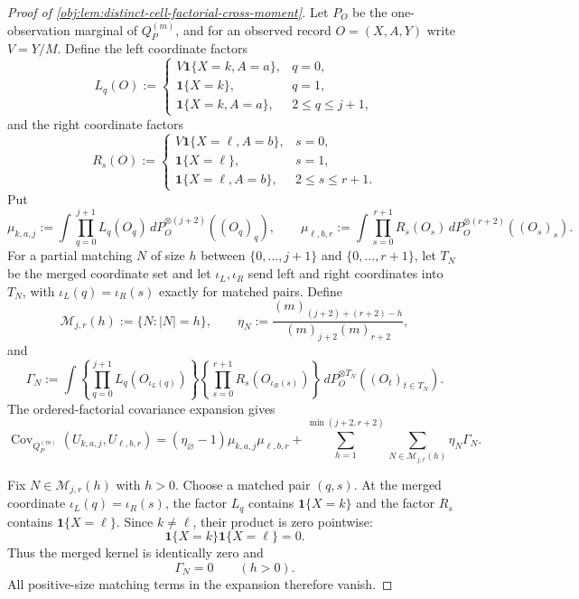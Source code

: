 \begin{proof}[Proof of \cref{obj:lem:distinct-cell-factorial-cross-moment}]
Let \(P_O\) be the one-observation marginal of \(Q_P^{(m)}\), and for an observed record \(O=(X,A,Y)\) write \(V=Y/M\).  Define the left coordinate factors
\[
L_q(O):=
\begin{cases}
V\mathbf 1\{X=k,A=a\}, & q=0,\\
\mathbf 1\{X=k\}, & q=1,\\
\mathbf 1\{X=k,A=a\}, & 2\le q\le j+1,
\end{cases}
\]
and the right coordinate factors
\[
R_s(O):=
\begin{cases}
V\mathbf 1\{X=\ell,A=b\}, & s=0,\\
\mathbf 1\{X=\ell\}, & s=1,\\
\mathbf 1\{X=\ell,A=b\}, & 2\le s\le r+1.
\end{cases}
\]
Put
\[
\mu_{k,a,j}:=
\int \prod_{q=0}^{j+1}L_q(O_q)\,
  dP_O^{\otimes(j+2)}((O_q)_q),
\qquad
\mu_{\ell,b,r}:=
\int \prod_{s=0}^{r+1}R_s(O_s)\,
  dP_O^{\otimes(r+2)}((O_s)_s).
\]
For a partial matching \(N\) of size \(h\) between \(\{0,\ldots,j+1\}\) and \(\{0,\ldots,r+1\}\), let \(T_N\) be the merged coordinate set and let \(\iota_L,\iota_R\) send left and right coordinates into \(T_N\), with \(\iota_L(q)=\iota_R(s)\) exactly for matched pairs.  Define
\[
\mathcal M_{j,r}(h):=\{N: |N|=h\},
\qquad
\eta_N:=
\frac{(m)_{(j+2)+(r+2)-h}}{(m)_{j+2}(m)_{r+2}},
\]
and
\[
\Gamma_N:=
\int
\left\{\prod_{q=0}^{j+1}L_q(O_{\iota_L(q)})\right\}
\left\{\prod_{s=0}^{r+1}R_s(O_{\iota_R(s)})\right\}
\,dP_O^{\otimes T_N}((O_t)_{t\in T_N}).
\]
The ordered-factorial covariance expansion gives
\[
\operatorname{Cov}_{Q_P^{(m)}}(U_{k,a,j},U_{\ell,b,r})
=
(\eta_{\varnothing}-1)\mu_{k,a,j}\mu_{\ell,b,r}
+
\sum_{h=1}^{\min(j+2,r+2)}
\sum_{N\in\mathcal M_{j,r}(h)}
\eta_N\Gamma_N .
\]

Fix \(N\in\mathcal M_{j,r}(h)\) with \(h>0\).  Choose a matched pair \((q,s)\).  At the merged coordinate \(\iota_L(q)=\iota_R(s)\), the factor \(L_q\) contains \(\mathbf 1\{X=k\}\) and the factor \(R_s\) contains \(\mathbf 1\{X=\ell\}\).  Since \(k\ne\ell\), their product is zero pointwise:
\[
\mathbf 1\{X=k\}\mathbf 1\{X=\ell\}=0.
\]
Thus the merged kernel is identically zero and
\[
\Gamma_N=0
\qquad (h>0).
\]
All positive-size matching terms in the expansion therefore vanish. %


\end{proof}
